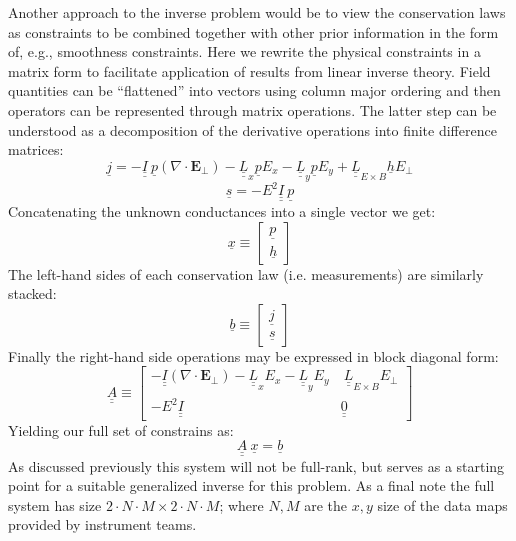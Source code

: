 \documentclass[11pt,letterpaper]{article}
\begin{document}
Another approach to the inverse problem would be to view the conservation laws as constraints to be combined together with other prior information in the form of, e.g., smoothness constraints.  Here we rewrite the physical constraints in a matrix form to facilitate application of results from linear inverse theory.  Field quantities can be ``flattened'' into vectors using column major ordering and then operators can be represented through matrix operations.  The latter step can be understood as a decomposition of the derivative operations into finite difference matrices:
\begin{equation}
\underline{j} = - \underline{\underline{I}} ~ \underline{p} \left( \nabla \cdot \mathbf{E}_\perp \right) - \underline{\underline{L}}_x \underline{p} E_x - \underline{\underline{L}}_y \underline{p} E_y + \underline{\underline{L}}_{E \times B} \underline{h} E_\perp
\end{equation}
\begin{equation}
\underline{s} = - E^2 \underline{\underline{I}} ~ \underline{p}
\end{equation}
Concatenating the unknown conductances into a single vector we get:
\begin{equation}
\underline{x} \equiv \left[ \begin{array}{c} \underline{p} \\ \underline{h} \end{array} \right]
\end{equation}
The left-hand sides of each conservation law (i.e. measurements) are similarly stacked:
\begin{equation}
\underline{b} \equiv \left[ \begin{array}{c} \underline{j} \\ \underline{s} \end{array} \right]
\end{equation}
Finally the right-hand side operations may be expressed in block diagonal form:
\begin{equation}
\underline{\underline{A}} \equiv \left[ \begin{array}{cc} -\underline{\underline{I}}  \left( \nabla \cdot \mathbf{E}_\perp \right) -  \underline{\underline{L}}_x  E_x - \underline{\underline{L}}_y E_y  & ~ \underline{\underline{L}}_{E \times B} E_\perp \\ -E^2 \underline{\underline{I}} & \underline{\underline{0}} \end{array} \right]
\end{equation}
Yielding our full set of constrains as:
\begin{equation}
\underline{\underline{A}} ~ \underline{x} = \underline{b}
\end{equation}
As discussed previously this system will not be full-rank, but serves as a starting point for a suitable generalized inverse for this problem.  As a final note the full system has size $2 \cdot N \cdot M \times 2 \cdot N \cdot M$; where $N,M$ are the $x,y$ size of the data maps provided by instrument teams.  
\end{document}
